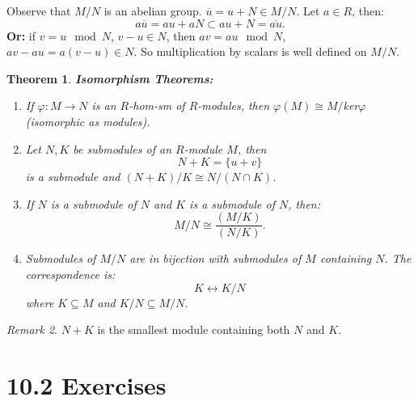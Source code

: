 \documentclass[12pt]{amsbook}
\theoremstyle{plain}
\newtheorem{theorem}{Theorem}[chapter]
\numberwithin{section}{chapter}
\numberwithin{equation}{chapter}
\theoremstyle{definition}
\theoremstyle{remark}
\newtheorem{rem}[theorem]{Remark}
\newcommand{\sub}{\subseteq}
\renewcommand{\phi}{\varphi}
\begin{document}
Observe that $M/N$ is an abelian group. $\overline{u} = u + N \in M/N$. Let $a \in R$, then: 
$$
a\overline{u} = au + aN \subset au + N = \overline{au}.
$$
\textbf{Or:} if $v = u \mod N$, $v - u \in N$, then $av = au \mod N$, $av - au = a(v - u) \in N$. So multiplication by scalars is well defined on $M/N$. 


\begin{theorem}
\textbf{Isomorphism Theorems:}
\begin{enumerate}
\item If $\phi:M \to N$ is an $R$-hom-sm of $R$-modules, then $\phi(M) \cong M/$ker$\phi$ (isomorphic as modules). 
\item Let $N,K$ be submodules of an $R$-module $M$, then 
$$
N + K = \{u + v\}
$$
is a submodule and $(N + K)/K \cong N/(N \cap K)$. 
\item If $N$ is a submodule of $N$ and $K$ is a submodule of $N$, then: 
$$
M/N \cong \frac{(M/K)}{(N/K)}.
$$
\item Submodules of $M/N$ are in bijection with submodules of $M$ containing $N$. The correspondence is:
$$
K \leftrightarrow K/N
$$
where $K \sub M$ and $K/N \sub M/N$. 
\end{enumerate}
\end{theorem}

\begin{rem}
$N + K$ is the smallest module containing both $N$ and $K$. 
\end{rem}

\section*{10.2 Exercises}
\end{document}
